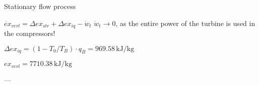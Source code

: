 Stationary flow process  

\( \dot{ex}_{verl} = \Delta ex_{str} + \Delta ex_{iq} - \dot{w}_t \)  
\( \dot{w}_t \to 0 \), as the entire power of the turbine is used in the compressors!  

\( \Delta ex_{iq} = (1 - T_0 / T_B) \cdot q_B = 969.58 \, \text{kJ/kg} \)  

\( ex_{verl} = 7710.38 \, \text{kJ/kg} \)  

---
